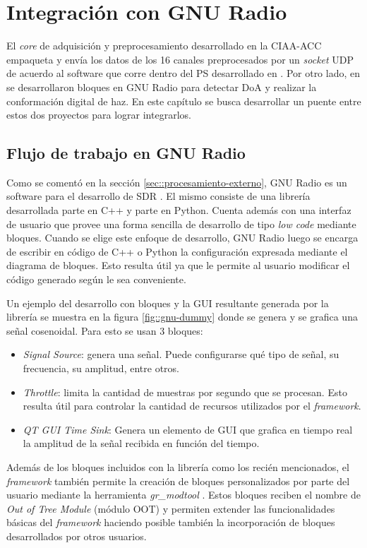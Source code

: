 \documentclass[../../main.tex]{subfiles}
\begin{document}
\graphicspath{{./figures}}
\chapter{Integración con GNU Radio}
El \textit{core} de adquisición y preprocesamiento desarrollado en la CIAA-ACC empaqueta y envía los datos de los 16 canales preprocesados por un \textit{socket} UDP de acuerdo al software que corre dentro del PS desarrollado en \cite{proyecto-jose}. Por otro lado, en \cite{proyecto-grigo} se desarrollaron bloques en GNU Radio para detectar DoA y realizar la conformación digital de haz. En este capítulo se busca desarrollar un puente entre estos dos proyectos para lograr integrarlos.

\section{Flujo de trabajo en GNU Radio}
Como se comentó en la sección \ref{sec::procesamiento-externo}, GNU Radio es un software para el desarrollo de SDR \cite{GNURadio}. El mismo consiste de una librería desarrollada parte en C++ y parte en Python. Cuenta además con una interfaz de usuario que provee una forma sencilla de desarrollo de tipo \textit{low code} mediante bloques. Cuando se elige este enfoque de desarrollo, GNU Radio luego se encarga de escribir en código de C++ o Python la configuración expresada mediante el diagrama de bloques. Esto resulta útil ya que le permite al usuario modificar el código generado según le sea conveniente.

Un ejemplo del desarrollo con bloques y la GUI resultante generada por la librería se muestra en la figura \ref{fig::gnu-dummy} donde se genera  y se grafica una señal cosenoidal. Para esto se usan 3 bloques: 
\begin{itemize}
    \item \textit{Signal Source}: genera una señal. Puede configurarse qué tipo de señal, su frecuencia, su amplitud, entre otros.
    \item \textit{Throttle}: limita la cantidad de muestras por segundo que se procesan. Esto resulta útil para controlar la cantidad de recursos utilizados por el \textit{framework}.
    \item \textit{QT GUI Time Sink}: Genera un elemento de GUI que grafica en tiempo real la amplitud de la señal recibida en función del tiempo.
\end{itemize}

Además de los bloques incluidos con la librería como los recién mencionados, el \textit{framework} también permite la creación de bloques personalizados por parte del usuario mediante la herramienta \textit{gr\_modtool} \cite{gr-modtool}. Estos bloques reciben el nombre de \textit{Out of Tree Module} (módulo OOT) y permiten extender las funcionalidades básicas del \textit{framework} haciendo posible también la incorporación de bloques desarrollados por otros usuarios.
\end{document}
